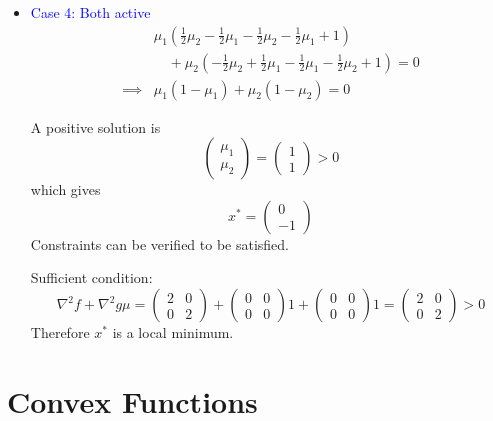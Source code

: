 \documentclass{article}
\begin{document}
\begin{itemize}
	\item \textcolor{blue}{Case 4: Both active}
	\begin{align*}
		& \mu_1(\frac{1}{2}\mu_2 - \frac{1}{2}\mu_1 - \frac{1}{2}\mu_2-\frac{1}{2}\mu_1 + 1) \\
		& \quad 
		+ \mu_2(-\frac{1}{2}\mu_2 + \frac{1}{2}\mu_1 - \frac{1}{2}\mu_1 - \frac{1}{2}\mu_2 + 1) = 0 \\
		\implies & \mu_1(1-\mu_1) + \mu_2(1-\mu_2) = 0
	\end{align*}	

	A positive solution is
	\[ 
		\begin{pmatrix}
	    	\mu_1\\
	    	\mu_2
	  	\end{pmatrix} = 
	  	\begin{pmatrix}
	    	1\\1
	  	\end{pmatrix} > 0 
	\]
	which gives
	\[
		x^{\ast} = 
			\begin{pmatrix}
	      		0 \\ -1
	    	\end{pmatrix}
	\]
	Constraints can be verified to be satisfied.
	
	Sufficient condition:
	\[ 
		\nabla^2 f + \nabla^2 g \mu = 
			\begin{pmatrix}
	    		2 & 0\\
	    		0 & 2
	  		\end{pmatrix} + 
	  		\begin{pmatrix}
	    		0 & 0\\
	    		0 & 0
	  		\end{pmatrix}1 + 
	  		\begin{pmatrix}
	    		0 & 0\\
	    		0 & 0
	  		\end{pmatrix}1 = 
	  		\begin{pmatrix}
	    		2 & 0\\
	    		0 & 2
	  		\end{pmatrix} > 0
	\]
	Therefore $x^{\ast}$ is a local minimum.	
	\end{itemize}

\section{Convex Functions}
\end{document}
